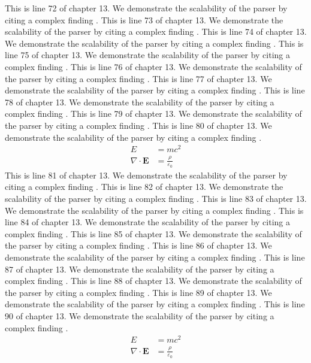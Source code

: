 This is line 72 of chapter 13. We demonstrate the scalability of the parser by citing a complex finding \cite{ref13_72}.
This is line 73 of chapter 13. We demonstrate the scalability of the parser by citing a complex finding \cite{ref13_73}.
This is line 74 of chapter 13. We demonstrate the scalability of the parser by citing a complex finding \cite{ref13_74}.
This is line 75 of chapter 13. We demonstrate the scalability of the parser by citing a complex finding \cite{ref13_75}.
This is line 76 of chapter 13. We demonstrate the scalability of the parser by citing a complex finding \cite{ref13_76}.
This is line 77 of chapter 13. We demonstrate the scalability of the parser by citing a complex finding \cite{ref13_77}.
This is line 78 of chapter 13. We demonstrate the scalability of the parser by citing a complex finding \cite{ref13_78}.
This is line 79 of chapter 13. We demonstrate the scalability of the parser by citing a complex finding \cite{ref13_79}.
This is line 80 of chapter 13. We demonstrate the scalability of the parser by citing a complex finding \cite{ref13_80}.
\begin{align*}
  E &= mc^2 \\
  \nabla \cdot \mathbf{E} &= \frac{\rho}{\varepsilon_0}
\end{align*}
This is line 81 of chapter 13. We demonstrate the scalability of the parser by citing a complex finding \cite{ref13_81}.
This is line 82 of chapter 13. We demonstrate the scalability of the parser by citing a complex finding \cite{ref13_82}.
This is line 83 of chapter 13. We demonstrate the scalability of the parser by citing a complex finding \cite{ref13_83}.
This is line 84 of chapter 13. We demonstrate the scalability of the parser by citing a complex finding \cite{ref13_84}.
This is line 85 of chapter 13. We demonstrate the scalability of the parser by citing a complex finding \cite{ref13_85}.
This is line 86 of chapter 13. We demonstrate the scalability of the parser by citing a complex finding \cite{ref13_86}.
This is line 87 of chapter 13. We demonstrate the scalability of the parser by citing a complex finding \cite{ref13_87}.
This is line 88 of chapter 13. We demonstrate the scalability of the parser by citing a complex finding \cite{ref13_88}.
This is line 89 of chapter 13. We demonstrate the scalability of the parser by citing a complex finding \cite{ref13_89}.
This is line 90 of chapter 13. We demonstrate the scalability of the parser by citing a complex finding \cite{ref13_90}.
\begin{align*}
  E &= mc^2 \\
  \nabla \cdot \mathbf{E} &= \frac{\rho}{\varepsilon_0}
\end{align*}
